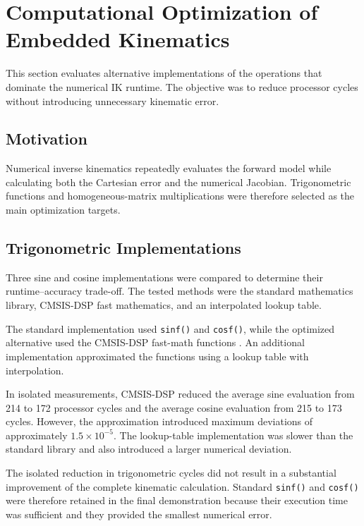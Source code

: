 \section{Computational Optimization of Embedded Kinematics}

This section evaluates alternative implementations of the operations that dominate the numerical IK runtime. The objective was to reduce processor cycles without introducing unnecessary kinematic error.

\subsection{Motivation}

Numerical inverse kinematics repeatedly evaluates the forward model while calculating both the Cartesian error and the numerical Jacobian. Trigonometric functions and homogeneous-matrix multiplications were therefore selected as the main optimization targets.

\subsection{Trigonometric Implementations}

Three sine and cosine implementations were compared to determine their runtime--accuracy trade-off. The tested methods were the standard mathematics library, CMSIS-DSP fast mathematics, and an interpolated lookup table.

The standard implementation used \texttt{sinf()} and \texttt{cosf()}, while the optimized alternative used the CMSIS-DSP fast-math functions \cite{cmsis_dsp}. An additional implementation approximated the functions using a lookup table with interpolation.

In isolated measurements, CMSIS-DSP reduced the average sine evaluation from 214 to 172 processor cycles and the average cosine evaluation from 215 to 173 cycles. However, the approximation introduced maximum deviations of approximately \(1.5 \times 10^{-5}\). The lookup-table implementation was slower than the standard library and also introduced a larger numerical deviation.

The isolated reduction in trigonometric cycles did not result in a substantial improvement of the complete kinematic calculation. Standard \texttt{sinf()} and \texttt{cosf()} were therefore retained in the final demonstration because their execution time was sufficient and they provided the smallest numerical error.

